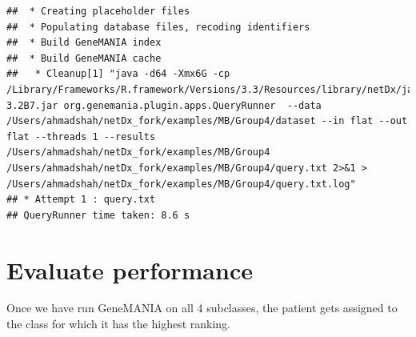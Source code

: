 \documentclass{article}\usepackage[]{graphicx}\usepackage[]{color}
\makeatletter
\newenvironment{kframe}{%
 \def\at@end@of@kframe{}%
 \ifinner\ifhmode%
  \def\at@end@of@kframe{\end{minipage}}%
  \begin{minipage}{\columnwidth}%
 \fi\fi%
 \def\FrameCommand##1{\hskip\@totalleftmargin \hskip-\fboxsep
 \colorbox{shadecolor}{##1}\hskip-\fboxsep
     \hskip-\linewidth \hskip-\@totalleftmargin \hskip\columnwidth}%
 \MakeFramed {\advance\hsize-\width
   \@totalleftmargin\z@ \linewidth\hsize
   \@setminipage}}%
 {\par\unskip\endMakeFramed%
 \at@end@of@kframe}
\newenvironment{knitrout}{}{} %
\makeatother
\begin{document}
\begin{knitrout}
\begin{kframe}
\begin{verbatim}
## 	* Creating placeholder files
## 	* Populating database files, recoding identifiers
## 	* Build GeneMANIA index
## 	* Build GeneMANIA cache
## 	 * Cleanup[1] "java -d64 -Xmx6G -cp /Library/Frameworks/R.framework/Versions/3.3/Resources/library/netDx/java/GeneMANIA-3.2B7.jar org.genemania.plugin.apps.QueryRunner  --data /Users/ahmadshah/netDx_fork/examples/MB/Group4/dataset --in flat --out flat --threads 1 --results /Users/ahmadshah/netDx_fork/examples/MB/Group4 /Users/ahmadshah/netDx_fork/examples/MB/Group4/query.txt 2>&1 > /Users/ahmadshah/netDx_fork/examples/MB/Group4/query.txt.log"
## * Attempt 1 : query.txt
## QueryRunner time taken: 8.6 s
\end{verbatim}
\end{kframe}
\end{knitrout}

\section{Evaluate performance}
Once we have run GeneMANIA on all 4 subclasses, the patient gets assigned to the class for which it has the highest ranking.
\end{document}
